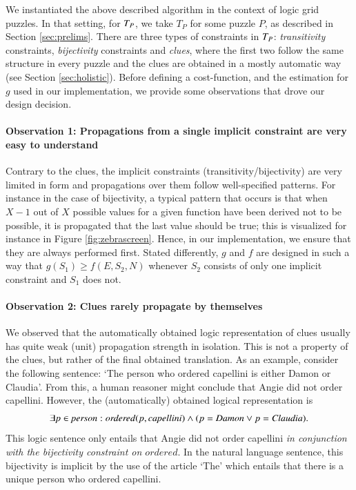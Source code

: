 We instantiated the above described algorithm in the context of logic grid puzzles. 
In that setting, for $T_P$, we take $T_P$ for some puzzle $P$, as described in Section \ref{sec:prelims}. 
There are three types of constraints in $T_P$: \emph{transitivity} constraints, \emph{bijectivity} constraints and \emph{clues}, where the first two follow the same structure in every puzzle and the clues are obtained in a mostly automatic way (see Section \ref{sec:holistic}). 
Before defining a cost-function, and the estimation for $g$ used in our implementation, we provide some observations that drove our design decision. 

\paragraph{Observation 1: Propagations from a single implicit constraint are very easy to understand}\label{obs:1:implicitconstraints} Contrary to the clues, the implicit constraints (transitivity/bijectivity) are very limited in form and propagations over them follow well-specified patterns. 
For instance in the case of bijectivity, a typical pattern that occurs is that when $X-1$ out of $X$ possible values for a given function have been derived not to be possible, it is propagated that the last value should be true; this is visualized for instance in Figure \ref{fig:zebrascreen}. 
Hence, in our implementation, we ensure that they are always performed first. Stated differently, $g$ and $f$ are designed in such a way that $g(S_1)\geq f(E,S_2,N)$  whenever $S_2$ consists of only one implicit constraint and $S_1$ does not. 

\paragraph{Observation 2: Clues rarely propagate by themselves}\label{obs:2:cluespropagate}
We observed that the automatically obtained logic representation of clues usually has quite weak (unit) propagation strength in isolation. 
This is not a property of the clues, but rather of the final obtained translation. As an example, consider the following sentence: 
`The person who ordered capellini is either Damon or Claudia'. From this, a human reasoner might conclude that Angie did not order capellini. 
However, the (automatically) obtained logical representation is 
\[\exists p\in \mathit{person}: \mathit{ordered}(p, \mathit{capellini})\land (p = \mathit{Damon} \lor p =  \mathit{Claudia}).\]
This logic sentence only entails that Angie did not order capellini \emph{in conjunction with the bijectivity constraint on $ \mathit{ordered}$}.
In the natural language sentence, this bijectivity is implicit by the use of the article `The' which entails that there is a unique person who ordered capellini. 


